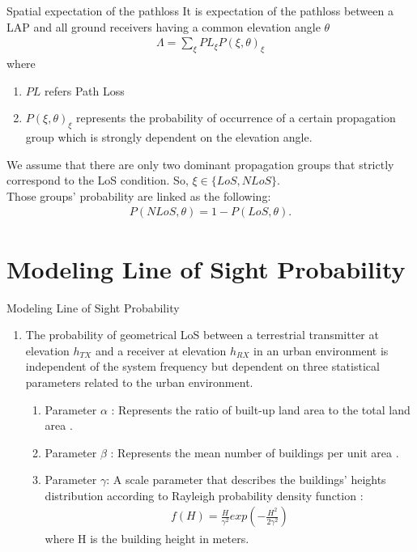 \documentclass{beamer}
\begin{document}
\begin{frame}{}
\begin{block}{Spatial expectation of the pathloss}
It is expectation of the pathloss between a LAP and all ground receivers having a common elevation angle $\theta$
\begin{align}
    \Lambda = \sum_{\xi} PL_\xi P(\xi, \theta)_\xi
    \label{eqn:2}
\end{align}
where
\begin{enumerate}
\item $PL$ refers Path Loss
\item $P(\xi, \theta)_\xi$ represents the probability of occurrence of a certain propagation group which is strongly dependent on the elevation angle.
\end{enumerate}
\end{block}

We assume that there are only two dominant propagation groups that strictly correspond to the LoS condition. So, $\xi \in \lbrace LoS, NLoS \rbrace$.\\
Those groups’ probability are linked as the following:
\begin{align}
    P(NLoS,\theta ) = 1 - P(LoS, \theta).
    \label{eqn:3}
\end{align}

\end{frame}
\section{Modeling Line of Sight Probability}
\begin{frame}{Modeling Line of Sight Probability}
    \begin{enumerate}
        \item The probability of geometrical LoS between a terrestrial transmitter at elevation $h_{TX}$ and a receiver at elevation $h_{RX}$ in an urban environment is independent of the system frequency but dependent on three statistical parameters related to the urban environment.
        \begin{enumerate}
            \item Parameter $\alpha$ : Represents the ratio of built-up land area to the total land area .
\item Parameter $\beta$ : Represents the mean number of buildings per unit area .
\item Parameter $\gamma$: A scale parameter that describes the buildings’ heights distribution according to Rayleigh probability density function :\begin{align*}
            f(H) = \frac{H}{\gamma^2 } exp(-\frac{H^2 }{2\gamma^2} )
        \end{align*}
 where H is the building height in meters.
 \end{enumerate}
    \end{enumerate}
\end{frame}
\end{document}
